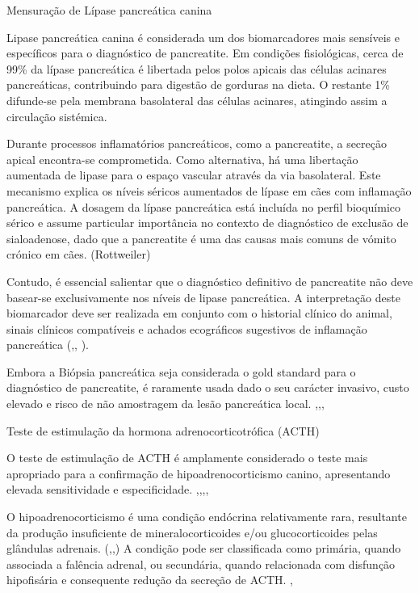 Mensuração de Lípase pancreática canina

Lipase pancreática canina é considerada um dos biomarcadores mais sensíveis e específicos para o diagnóstico de pancreatite. \cite{Kim2024} Em condições fisiológicas, cerca de 99\% da lípase pancreática é libertada pelos polos apicais das células acinares pancreáticas, contribuindo para digestão de gorduras na dieta. \cite{Lim2022} O restante 1\% difunde-se pela membrana basolateral das células acinares, atingindo assim a circulação sistémica.\cite{Lim2022}


Durante processos inflamatórios pancreáticos, como a pancreatite, a secreção apical encontra-se comprometida. Como alternativa, há uma libertação aumentada de lipase para o espaço vascular através da via basolateral. \cite{Lim2022} Este mecanismo explica os níveis séricos aumentados de lípase em cães com inflamação pancreática.
A dosagem da lípase pancreática está incluída no perfil bioquímico sérico e assume particular importância no contexto de diagnóstico de exclusão de sialoadenose, dado que a pancreatite é uma das causas mais comuns de vómito crónico em cães. (Rottweiler) 


Contudo, é essencial salientar que o diagnóstico definitivo de pancreatite não deve basear-se exclusivamente nos níveis de lipase pancreática. A interpretação deste biomarcador deve ser realizada em conjunto com o historial clínico do animal, sinais clínicos compatíveis e achados ecográficos sugestivos de inflamação pancreática (\cite{Cridge2021},\cite{Kim2024}, \cite{Lim2022}).


Embora a Biópsia pancreática seja considerada o gold standard para o diagnóstico de pancreatite, é raramente usada dado o seu carácter invasivo, custo elevado e risco de não amostragem da lesão pancreática local. \cite{Cridge2021},\cite{Kim2024},\cite{Lim2022}, \cite{Liu2025}


Teste de estimulação da hormona adrenocorticotrófica (ACTH)


O teste de estimulação de ACTH é amplamente considerado o teste mais apropriado para a confirmação de hipoadrenocorticismo canino, apresentando elevada sensitividade e especificidade. \cite{Guzman-Ramos2022},\cite{Wakayama2017},\cite{Botsford2018},\cite{Spence2018},\cite{Mooney2023}


O hipoadrenocorticismo é uma condição endócrina relativamente rara, resultante da produção insuficiente de mineralocorticoides e/ou glucocorticoides pelas glândulas adrenais. (\cite{Guzman-Ramos2022},\cite{Wakayama2017},\cite{Mooney2023}) A condição pode ser classificada como primária, quando associada a falência adrenal, ou secundária, quando relacionada com disfunção hipofisária e consequente redução da secreção de ACTH. \cite{Botsford2018},\cite{Mooney2023}


